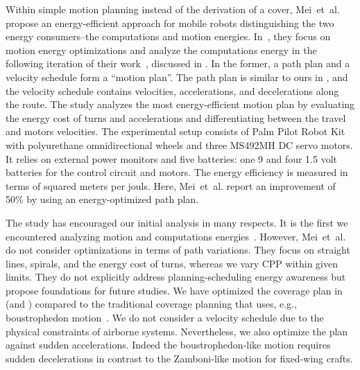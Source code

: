 Within simple motion planning instead of the derivation of a cover, Mei~et~al. propose an energy-efficient approach for mobile robots distinguishing the two energy consumers--the computations and motion energies. In~\citep{mei2004energy}, they focus on motion energy optimizations and analyze the computations energy in the following iteration of their work~\citep{mei2005case}, discussed in . In the former, a path plan and a velocity schedule form a ``motion plan''. The path plan is similar to ours in , and the velocity schedule contains velocities, accelerations, and decelerations along the route. The study analyzes the most energy-efficient motion plan by evaluating the energy cost of turns and accelerations and differentiating between the travel and motors velocities. 
The experimental setup consists of Palm Pilot Robot Kit with polyurethane omnidirectional wheels and three MS492MH DC servo motors. It relies on external power monitors 
and five batteries: one 9 and four 1.5 volt batteries for the control circuit and motors. The energy efficiency is measured in terms of squared meters per jouls. Here, Mei~et~al. report an improvement of 50\% by using an energy-optimized path plan. 

The study has encouraged our initial analysis in many respects. It is the first we encountered analyzing motion and computations energies~\citep{mei2005case}. However, Mei~et~al. do not consider optimizations in terms of path variations. They focus on straight lines, spirals, and the energy cost of turns, whereas we vary CPP within given limits. They do not explicitly address planning-scheduling energy awareness but propose foundations for future studies. 
We have optimized the coverage plan in  (and ) compared to the traditional coverage planning that uses, e.g., boustrophedon motion~\citep{lavalle2006planning}. We do not consider a velocity schedule due to the physical constraints of airborne systems. Nevertheless, we also optimize the plan against sudden accelerations. Indeed the boustrophedon-like motion requires sudden decelerations in contrast to the Zamboni-like motion for fixed-wing crafts. 

